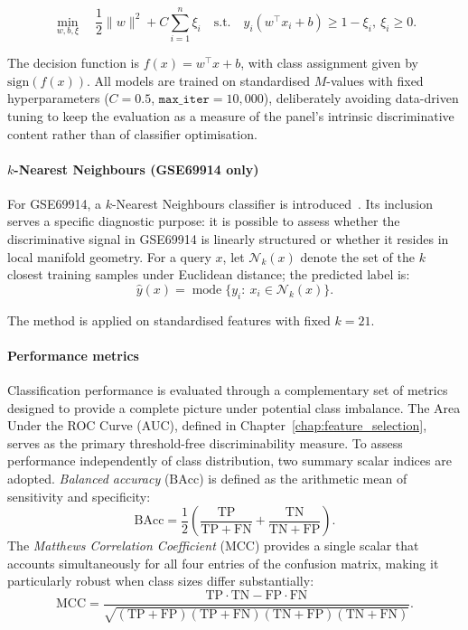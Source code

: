 \begin{equation}
\min_{w,b,\xi} \quad
\frac{1}{2}\lVert w\rVert^2 + C \sum_{i=1}^n \xi_i
\quad\text{s.t.}\quad
y_i(w^\top x_i + b) \ge 1 - \xi_i,\ \xi_i \ge 0.
\end{equation}

\noindent The decision function is $f(x) = w^\top x + b$, with class
assignment given by $\mathrm{sign}(f(x))$. All models are
trained on standardised $M$-values with fixed hyperparameters
($C = 0.5$, $\texttt{max\_iter} = 10{,}000$), deliberately
avoiding data-driven tuning to keep the evaluation as a
measure of the panel's intrinsic discriminative content rather
than of classifier optimisation.

\paragraph{$k$-Nearest Neighbours (GSE69914 only)}

For GSE69914, a $k$-Nearest Neighbours classifier is
introduced~\cite{cover1967nn}. Its inclusion
serves a specific diagnostic purpose: it is possible to assess whether the discriminative
signal in GSE69914 is linearly structured or whether it
resides in local manifold geometry. For a query $x$, let
$\mathcal{N}_k(x)$ denote the set of the $k$ closest training
samples under Euclidean distance; the predicted label is:
\begin{equation}
\hat{y}(x) = \operatorname{mode}\{y_i :\ x_i \in \mathcal{N}_k(x)\}.
\end{equation}

\noindent The method is applied on standardised features with fixed $k = 21$.

\paragraph{Performance metrics}

Classification performance is evaluated through a complementary set of metrics
designed to provide a complete picture under potential class imbalance. The
Area Under the ROC Curve (AUC), defined in
Chapter~\ref{chap:feature_selection}, serves as the primary threshold-free
discriminability measure.
To assess performance independently of class distribution, two summary scalar
indices are adopted. \emph{Balanced accuracy} ($\mathrm{BAcc}$) is defined as
the arithmetic mean of sensitivity and specificity:
\begin{equation}
\mathrm{BAcc} = \frac{1}{2}\!\left(
  \frac{\mathrm{TP}}{\mathrm{TP}+\mathrm{FN}} +
  \frac{\mathrm{TN}}{\mathrm{TN}+\mathrm{FP}}
\right).
\end{equation}
The \emph{Matthews Correlation Coefficient} (MCC) provides a single scalar
that accounts simultaneously for all four entries of the confusion matrix,
making it particularly robust when class sizes differ substantially:
\begin{equation}
\mathrm{MCC} =
\frac{\mathrm{TP}\cdot\mathrm{TN} - \mathrm{FP}\cdot\mathrm{FN}}
{\sqrt{(\mathrm{TP}+\mathrm{FP})(\mathrm{TP}+\mathrm{FN})
       (\mathrm{TN}+\mathrm{FP})(\mathrm{TN}+\mathrm{FN})}}.
\end{equation}

